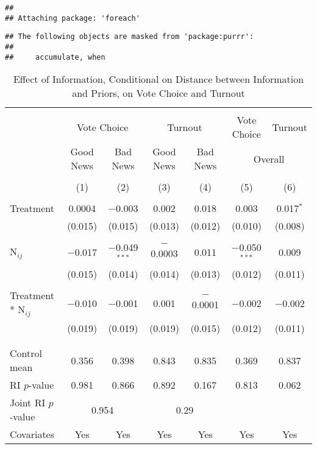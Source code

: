 \documentclass[]{article}
\begin{document}
\begin{verbatim}
## 
## Attaching package: 'foreach'
\end{verbatim}

\begin{verbatim}
## The following objects are masked from 'package:purrr':
## 
##     accumulate, when
\end{verbatim}

\begin{table}[!htbp] \centering 
  \caption{Effect of Information, Conditional on Distance between Information and Priors, on Vote Choice and Turnout} 
  \label{main_results} 
\begin{tabular}{@{\extracolsep{1pt}}lcccccc} 
\\[-1.8ex]\hline 
\hline \\[-1.8ex] 
 & \multicolumn{2}{c}{Vote Choice}&\multicolumn{2}{c}{Turnout}& Vote Choice & Turnout \\ 
\cline{2-7} 
 & Good News & Bad News & Good News & Bad News & \multicolumn{2}{c}{Overall} \\ 
\\[-1.8ex] & (1) & (2) & (3) & (4) & (5) & (6)\\ 
\hline \\[-1.8ex] 
 Treatment & 0.0004 & $-$0.003 & 0.002 & 0.018 & 0.003 & 0.017$^{*}$ \\ 
  & (0.015) & (0.015) & (0.013) & (0.012) & (0.010) & (0.008) \\ 
  & & & & & & \\ 
 N$_{ij}$ & $-$0.017 & $-$0.049$^{***}$ & $-$0.0003 & 0.011 & $-$0.050$^{***}$ & 0.009 \\ 
  & (0.015) & (0.014) & (0.014) & (0.013) & (0.012) & (0.011) \\ 
  & & & & & & \\ 
 Treatment * N$_{ij}$ & $-$0.010 & $-$0.001 & 0.001 & $-$0.0001 & $-$0.002 & $-$0.002 \\ 
  & (0.019) & (0.019) & (0.019) & (0.015) & (0.012) & (0.011) \\ 
  & & & & & & \\ 
\hline \\[-1.8ex] 
Control mean & 0.356 & 0.398 & 0.843 & 0.835 & 0.369 & 0.837 \\ 
RI $p$-value & 0.981 & 0.866 & 0.892 & 0.167 & 0.813 & 0.062 \\ 
Joint RI $p$-value & \multicolumn{2}{c}{0.954} & \multicolumn{2}{c}{0.29} \\
Covariates & Yes & Yes & Yes & Yes & Yes & Yes \\ 

\end{tabular}
\end{table}
\end{document}
